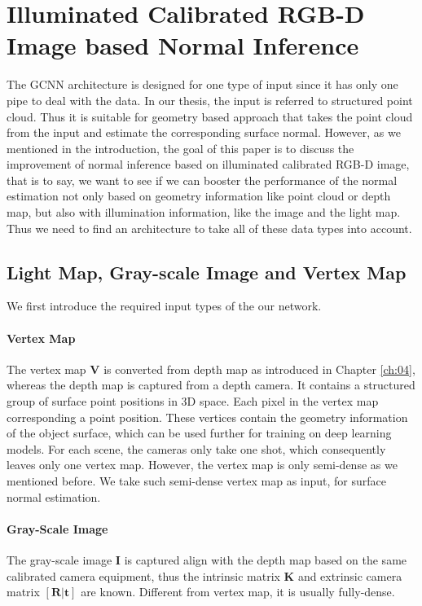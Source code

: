 \section{Illuminated Calibrated RGB-D Image based Normal Inference}
\label{sec:trip-net}
The GCNN architecture is designed for one type of input since it has only one pipe to deal with the data. In our thesis, the input is referred to structured point cloud. Thus it is suitable for geometry based approach that takes the point cloud from the input and estimate the corresponding surface normal. However, as we mentioned in the introduction, the goal of this paper is to discuss the improvement of normal inference based on illuminated calibrated RGB-D image, that is to say, we want to see if we can booster the performance of the normal estimation not only based on geometry information like point cloud or depth map, but also with illumination information, like the image and the light map. Thus we need to find an architecture to take all of these data types into account. 


\subsection{Light Map, Gray-scale Image and Vertex Map}
\label{sec:lightmap}
We first introduce the required input types of the our network.

\paragraph{Vertex Map}
The vertex map $ \textbf{V} $ is converted from depth map as introduced in Chapter \ref{ch:04}, whereas the depth map is captured from a depth camera. It contains a structured group of surface point positions in 3D space. Each pixel in the vertex map corresponding a point position. These vertices contain the geometry information of the object surface, which can be used further for training on deep learning models. For each scene,  the cameras only take one shot, which consequently leaves only one vertex map. However, the vertex map is only semi-dense as we mentioned before. We take such semi-dense vertex map as input, for surface normal estimation.

\paragraph{Gray-Scale Image}
The gray-scale image $ \textbf{I} $ is captured align with the depth map based on the same calibrated camera equipment, thus the intrinsic matrix $ \textbf{K} $ and extrinsic camera matrix $ [\textbf{R}|\textbf{t}] $ are known. Different from vertex map, it is usually fully-dense.


